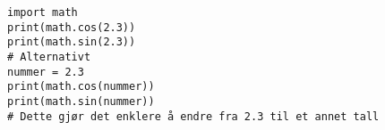 %
%
\begin {lstlisting}
import math
print(math.cos(2.3))
print(math.sin(2.3))
# Alternativt
nummer = 2.3
print(math.cos(nummer))
print(math.sin(nummer))
# Dette gjør det enklere å endre fra 2.3 til et annet tall
\end{lstlisting}
